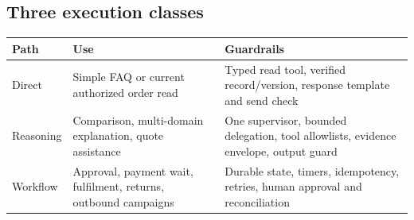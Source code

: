\documentclass[10.5pt,a4paper,oneside]{article}
\begin{document}
\subsection{Three execution classes}
\begin{tabularx}{\textwidth}{@{}L{30mm}Y Y@{}}
\toprule{}\textbf{Path} & \textbf{Use} & \textbf{Guardrails}\\\midrule
Direct & Simple FAQ or current authorized order read & Typed read tool, verified record/version, response template and send check\\
Reasoning & Comparison, multi-domain explanation, quote assistance & One supervisor, bounded delegation, tool allowlists, evidence envelope, output guard\\
Workflow & Approval, payment wait, fulfilment, returns, outbound campaigns & Durable state, timers, idempotency, retries, human approval and reconciliation\\
\bottomrule
\end{tabularx}
\end{document}
